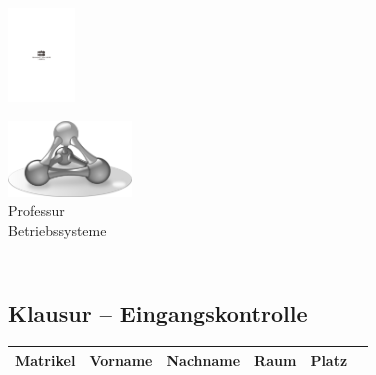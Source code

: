 \documentclass[12pt]{article}
\begin{document}
  \begin{minipage}[c]{4cm}
  \includegraphics[height=2.5cm,width=\textwidth,keepaspectratio]{../lib/TUC}
  \end{minipage}%
  \hfill%
  \begin{minipage}[c]{4cm}
  \includegraphics[height=2cm,width=\textwidth,keepaspectratio]{../lib/logo-sw} \\
  {\scriptsize{Professur\\[-2.5mm] Betriebssysteme}\vspace{1mm}}
  \end{minipage}


\begin{centering}
\section*{\coursename \xspace \coursesemester \\ Klausur -- Eingangskontrolle}
\end{centering}


\begin{tabularx}{\textwidth}{cllllr}
\toprule
Matrikel & Vorname & Nachname & Raum & Platz \\
\midrule

\bottomrule
\end{tabularx}
\end{document}
